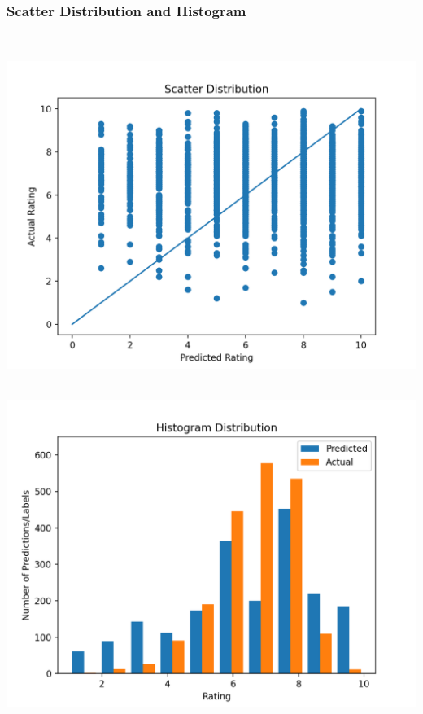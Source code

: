 \documentclass[11pt]{article}
\begin{document}
\subsubsection{Scatter Distribution and Histogram}
\mbox{}\\
\begin{minipage}{0.45\textwidth}
\includegraphics[scale=0.5]{logistic_regression/scatter.png}
\end{minipage}
\hfill
\begin{minipage}{0.45\textwidth}
\mbox{}\\
\includegraphics[scale=0.5]{logistic_regression/histogram.png}
\end{minipage}
\end{document}
